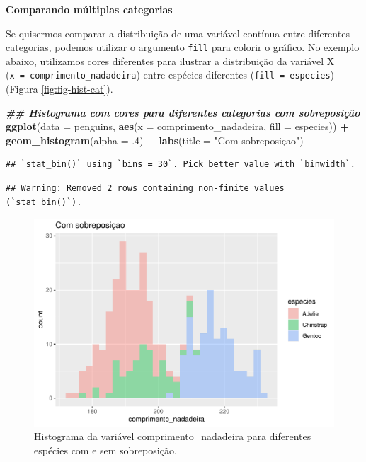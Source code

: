 \documentclass[
]{article}
\newenvironment{Shaded}{\begin{snugshade}}{\end{snugshade}}
\newcommand{\AttributeTok}[1]{\textcolor[rgb]{0.13,0.29,0.53}{#1}}
\newcommand{\DecValTok}[1]{\textcolor[rgb]{0.00,0.00,0.81}{#1}}
\newcommand{\DocumentationTok}[1]{\textcolor[rgb]{0.56,0.35,0.01}{\textbf{\textit{#1}}}}
\newcommand{\FunctionTok}[1]{\textcolor[rgb]{0.13,0.29,0.53}{\textbf{#1}}}
\newcommand{\NormalTok}[1]{#1}
\newcommand{\SpecialCharTok}[1]{\textcolor[rgb]{0.81,0.36,0.00}{\textbf{#1}}}
\newcommand{\StringTok}[1]{\textcolor[rgb]{0.31,0.60,0.02}{#1}}
\begin{document}
\textbf{Comparando múltiplas categorias}

Se quisermos comparar a distribuição de uma variável contínua entre diferentes categorias, podemos utilizar o argumento \texttt{fill} para colorir o gráfico. No exemplo abaixo, utilizamos cores diferentes para ilustrar a distribuição da variável X (\texttt{x\ =\ comprimento\_nadadeira}) entre espécies diferentes (\texttt{fill\ =\ especies}) (Figura \ref{fig:fig-hist-cat}).

\begin{Shaded}
\begin{Highlighting}[]
\DocumentationTok{\#\# Histograma com cores para diferentes categorias com sobreposição}
\FunctionTok{ggplot}\NormalTok{(}\AttributeTok{data =}\NormalTok{ penguins, }
       \FunctionTok{aes}\NormalTok{(}\AttributeTok{x =}\NormalTok{ comprimento\_nadadeira, }\AttributeTok{fill =}\NormalTok{ especies)) }\SpecialCharTok{+}
    \FunctionTok{geom\_histogram}\NormalTok{(}\AttributeTok{alpha =}\NormalTok{ .}\DecValTok{4}\NormalTok{) }\SpecialCharTok{+}
    \FunctionTok{labs}\NormalTok{(}\AttributeTok{title =} \StringTok{"Com sobreposiçao"}\NormalTok{)}
\end{Highlighting}
\end{Shaded}

\begin{verbatim}
## `stat_bin()` using `bins = 30`. Pick better value with `binwidth`.
\end{verbatim}

\begin{verbatim}
## Warning: Removed 2 rows containing non-finite values (`stat_bin()`).
\end{verbatim}

\begin{figure}
\includegraphics[width=0.75\linewidth,height=0.75\textheight]{epr_files/figure-latex/fig-hist-cat-1} \caption{Histograma da variável comprimento_nadadeira para diferentes espécies com e sem sobreposição.}\label{fig:fig-hist-cat-1}
\end{figure}
\end{document}
